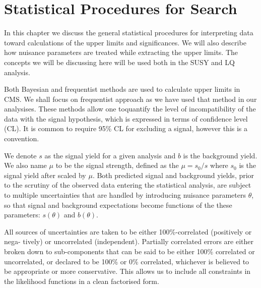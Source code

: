 \chapter{Statistical Procedures for Search  \label{Statistical Procedures for Search}}

In this chapter we discuss the general statistical procedures for interpreting data toward calculations of the upper limits and significances. We will also describe how nuisance parameters are treated while extracting the upper limits. The concepts we will be discussing here will be used both in the SUSY and LQ analysis.

Both Bayesian and frequentist methods are used to calculate upper limits in CMS. We shall focus on  frequentist approach as we have used that method in our analysises. These methods allow one toquantify the level of incompatibility of the data with the signal hypothesis, which is expressed in terms of  confidence level (CL). It is common to require 95\% CL for excluding a signal, however this is a convention.

We denote $s$ as the signal yield for a given analysis and  $b$ is the background yield. We also name $\mu$ to be the signal strength, defined as the $\mu =s_{0}/s$ where $s_{0}$ is the signal yield after scaled by $\mu$. Both predicted signal and background yields, prior to the scrutiny of the observed data entering the statistical analysis, are subject to multiple uncertainties that are handled
by introducing nuisance parameters $\theta$, so that signal and background expectations become
functions of the these parameters: $s(\theta)$ and $b(\theta)$.

All sources of uncertainties are taken to be either 100\%-correlated (positively or nega-
tively) or uncorrelated (independent).  Partially correlated errors are either broken down
to  sub-components  that  can  be  said  to  be  either  100\%  correlated  or  uncorrelated,  or
declared  to  be  100\%  or  0\%  correlated,  whichever  is  believed  to  be  appropriate  or  more
conservative.   This  allows  us  to  include  all  constraints  in  the  likelihood  functions  in  a
clean factorised form.





